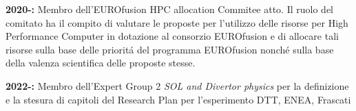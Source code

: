 \begin{enumerate}[label={[E\arabic*]}]
\item \textbf{2020-:} Membro dell'EUROfusion HPC allocation Commitee
  atto. Il ruolo del comitato ha il compito di valutare le proposte per
  l'utilizzo delle risorse per High Performance Computer in dotazione
  al consorzio EUROfusion e di allocare tali risorse sulla base delle
  priorit\'a del programma EUROfusion nonch\'e sulla base della
  valenza scientifica delle proposte stesse. 

\item \textbf{2022-:}  Membro dell'Expert Group 2 \emph{SOL and
    Divertor physics } per la definizione e la stesura di capitoli del
  Research Plan
  per l’esperimento DTT, ENEA, Frascati

\end{enumerate}
